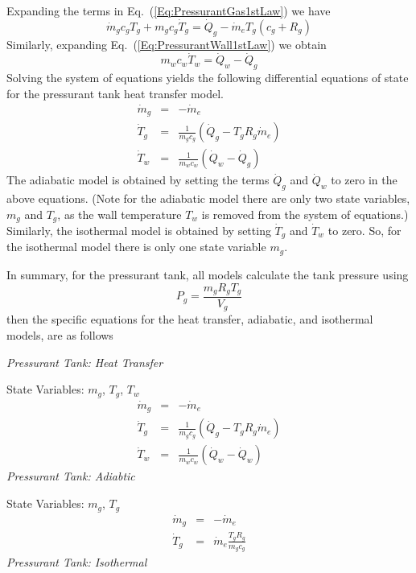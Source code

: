 Expanding the terms in Eq.~(\ref{Eq:PressurantGas1stLaw}) we have
%
\begin{equation}
    \dot{m}_g c_g T_g + m_g c_g \dot{T}_g = \dot{Q}_g - \dot{m}_e T_g \left( c_g + R_g\right)
\end{equation}
%
Similarly, expanding Eq.~(\ref{Eq:PressurantWall1stLaw}) we obtain
%
\begin{equation}
    m_w c_w \dot{T}_w = \dot{Q}_w -  \dot{Q}_g
\end{equation}
%
Solving the system of equations yields the following differential
equations of state for the pressurant tank heat transfer model.
%
\begin{eqnarray}
    \dot{m}_g &=& -\dot{m}_e\\
    \dot{T}_g &=& \frac{1}{m_g c_g} \left( \dot{Q}_g - T_g R_g  \dot{m}_e  \right)\\
    \dot{T}_w &=& \frac{1}{m_w c_w} \left( \dot{Q}_w - \dot{Q}_g  \right)
\end{eqnarray}
%
The adiabatic model is obtained by setting the terms $\dot{Q}_g$ and
$\dot{Q}_w$ to zero in the above equations.  (Note for the adiabatic
model there are only two state variables, $m_g$ and $T_g$, as the
wall temperature $T_w$ is removed from the system of equations.)
Similarly, the isothermal model is obtained by setting $\dot{T}_g$
and $\dot{T}_w$ to zero.  So, for the isothermal model there is only
one state variable $m_g$.

In summary, for the pressurant tank, all models calculate the tank
pressure using
%
\[
   P_g = \frac{m_g R_g T_g}{V_g}
\]
%
 then the specific equations for the heat transfer, adiabatic, and
isothermal models, are as follows

\noindent\textit{Pressurant Tank:  Heat Transfer}

\noindent State Variables:  $m_g$, $T_g$, $T_w$
%
\begin{eqnarray}
    \dot{m}_g &=& -\dot{m}_e \nonumber\\
    \dot{T}_g &=& \frac{1}{m_g c_g} \left( \dot{Q}_g - T_g R_g  \dot{m}_e  \right)\nonumber\\
    \dot{T}_w &=& \frac{1}{m_w c_w} \left( \dot{Q}_w - \dot{Q}_w  \right)\nonumber
\end{eqnarray}
%
\textit{Pressurant Tank:  Adiabtic}

\noindent State Variables:  $m_g$, $T_g$
%
\begin{eqnarray}
    \dot{m}_g &=& -\dot{m}_e \nonumber\\
    \dot{T}_g &=& \dot{m}_e\frac{T_g R_g   }{m_g c_g} \nonumber
\end{eqnarray}
%
\noindent\textit{Pressurant Tank:  Isothermal}

